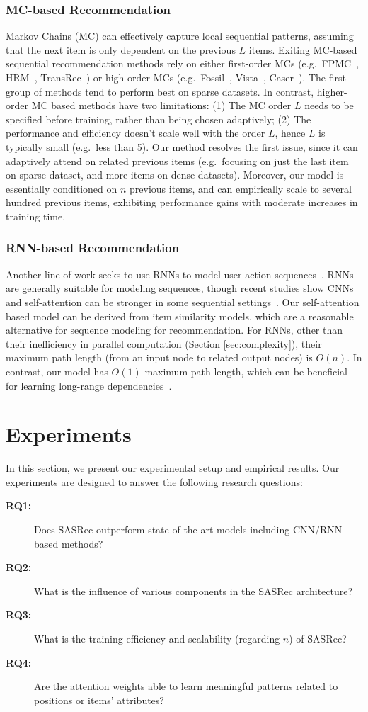 \documentclass[conference]{IEEEtran}
\newcommand{\xhdr}[1]{\subsubsection*{\bf #1}}
\begin{document}
\xhdr{MC-based Recommendation} Markov Chains (MC) can effectively capture local sequential patterns, 
assuming  that
the next item is only 
dependent
on the previous $L$ items. Exiting MC-based sequential recommendation methods rely on either first-order MCs (e.g.~FPMC~\cite{rendle2010fpmc}, HRM~\cite{hrm}, TransRec~\cite{DBLP:conf/recsys/HeKM17}) or high-order MCs (e.g.~Fossil~\cite{DBLP:conf/icdm/HeM16}, Vista~\cite{DBLP:conf/recsys/HeFWM16}, Caser~\cite{DBLP:conf/wsdm/TangW18}). 
The first group of methods
tend to perform best on sparse datasets.
In contrast,
higher-order MC based methods
have two limitations: (1) The MC order $L$ needs to be specified before 
training, 
rather than being chosen
adaptively; (2) The performance and efficiency doesn't scale well 
with the
order $L$, 
hence $L$ is typically small
(e.g.~less than 5). 
Our method 
resolves
the first issue, since it can adaptively attend on related previous items (e.g.~focusing on just the last item 
on sparse dataset, and 
more items on dense datasets). Moreover, our model is essentially conditioned on $n$ previous items, and can empirically scale to 
several
hundred previous items,
exhibiting performance gains with moderate increases in training time.

\xhdr{RNN-based Recommendation} Another line of work seeks to use RNNs to model user action sequences~\cite{DBLP:journals/corr/HidasiKBT15,DBLP:journals/corr/HidasiK17,DBLP:conf/wsdm/WuABSJ17}. RNNs are generally suitable for modeling sequences, though recent studies show CNNs and self-attention can be stronger in some sequential settings~\cite{transform,DBLP:journals/corr/abs-1803-01271}. Our self-attention based model can be derived from item similarity models, which are a reasonable alternative for sequence modeling for recommendation. For RNNs, other than their inefficiency in parallel computation (Section \ref{sec:complexity}), 
their
maximum path length (from an input node to related output nodes) is $O(n)$. In contrast, our model has $O(1)$ maximum path length, 
which can be beneficial
for learning long-range dependencies~\cite{hochreiter2001gradient}. 

\section{Experiments}

In this section, we present 
our
experimental setup and empirical results. Our experiments are designed to answer the following research questions:
\begin{description}
\item[\textbf{RQ1:}] Does 
SASRec
outperform state-of-the-art models including CNN/RNN based methods?
\item[\textbf{RQ2:}] What 
is the influence of various
components in the SASRec architecture?
\item[\textbf{RQ3:}] What is the training efficiency and scalability (regarding $n$) of SASRec?
\item[\textbf{RQ4:}] Are the attention weights able to learn meaningful patterns related to positions or items' attributes?
\end{description}
\end{document}
